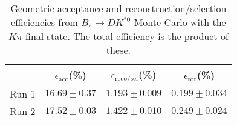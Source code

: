 \begin{table}
    \centering
    \begin{tabular}{cccc}
        \toprule
        & $\epsilon_\mathrm{acc}$(\%) &  $\epsilon_\mathrm{reco/sel}$(\%) &  $\epsilon_\mathrm{tot}$(\%) \\
        \midrule
        Run 1 & $16.69 \pm 0.37$ & $1.193 \pm 0.009$ & $0.199 \pm 0.034$ \\
        Run 2 & $17.52 \pm 0.03$ & $1.422 \pm 0.010$ & $0.249 \pm 0.024$ \\
        \bottomrule
    \end{tabular}
    \caption{Geometric acceptance and reconstruction/selection efficiencies from  $B_s \to DK^{*0}$ Monte Carlo with the $K\pi$ final state.  The total efficiency is the product of these.}
\label{tab:selection_efficiency_Bs}
\end{table}
